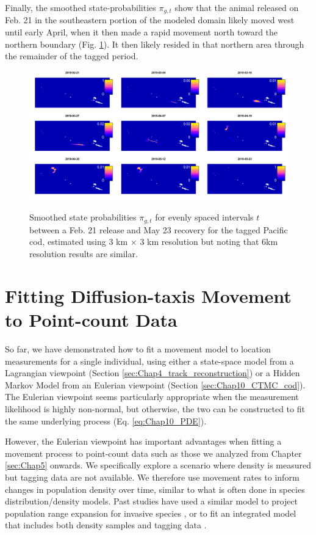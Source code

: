 Finally, the smoothed state-probabilities \( \pi_{g,t} \) show that the animal released on Feb. 21 in the southeastern portion of the modeled domain likely moved west until early April, when it then made a rapid movement north toward the northern boundary (Fig. \ref{fig:Smoothed_cod_results}).  It then likely resided in that northern area through the remainder of the tagged period.   

\begin{figure}[!ht]
    \caption[Smoothed state-probabilities for tagged cod]{Smoothed state probabilities \( \pi_{g,t} \) for evenly spaced intervals \(t\) between a Feb. 21 release and May 23 recovery for the tagged Pacific cod, estimated using 3 km \(\times\) 3 km resolution but noting that 6km resolution results are similar.}
\centering
    \includegraphics[width=5.5in]{Chap_10/Smoothed_results_3_Small.png}
    \label{fig:Smoothed_cod_results}
\end{figure}

\section{Fitting Diffusion-taxis Movement to Point-count Data} \label{sec:Chap10_CTMC_eagle}

So far, we have demonstrated how to fit a movement model to location measurements for a single individual, using either a state-space model from a Lagrangian viewpoint (Section \ref{sec:Chap4_track_reconstruction}) or a Hidden Markov Model from an Eulerian viewpoint (Section \ref{sec:Chap10_CTMC_cod}).  The Eulerian viewpoint seems particularly appropriate when the measurement likelihood is highly non-normal, but otherwise, the two can be constructed to fit the same underlying process (Eq. \ref{eq:Chap10_PDE}).  

However, the Eulerian viewpoint has important advantages when fitting a movement process to point-count data such as those we analyzed from Chapter \ref{sec:Chap5} onwards.  We specifically explore a scenario where density is measured but tagging data are not available.  We therefore use movement rates to inform changes in population density over time, similar to what is often done in species distribution/density models.  Past studies have used a similar model to project population range expansion for invasive species \cite{hooten_statistical_2010}, or to fit an integrated model that includes both density samples and tagging data \cite{thorson_estimating_2021}.

